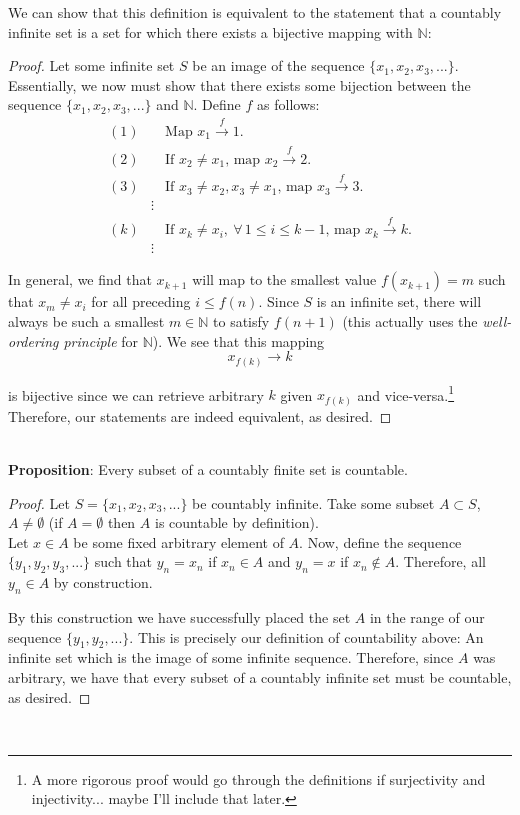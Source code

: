\documentclass[12pt]{article}
\newlength\tindent
\renewcommand{\indent}{\hspace*{\tindent}}
\newcommand{\N}{\mathbb N}
\begin{document}
\indent We can show that this definition is equivalent to the statement that a countably infinite set is a set for which there exists a bijective mapping with $\N$:
\begin{proof} Let some infinite set $S$ be an image of the sequence $\{x_1, x_2, x_3,...\}$. Essentially, we now must show that there exists some bijection between the sequence $\{x_1, x_2, x_3,...\}$ and $\N$. Define $f$ as follows:
\begin{align*}
	(1)& \quad \text{Map $x_1 \stackrel{f}{\to} 1$.} \\
	(2)& \quad \text{If $x_2 \neq x_1$, map $x_2 \stackrel{f}{\to} 2$.} \\
	(3)& \quad \text{If $x_3 \neq x_2, x_3 \neq x_1$, map $x_3 \stackrel{f}{\to} 3$.} \\
	&\vdots \\
	(k)& \quad \text{If $x_k \neq x_i,~\forall\,1 \leq i \leq k - 1$, map $x_k \stackrel{f}{\to} k$.} \\
	&\vdots 
\end{align*}

\indent In general, we find that $x_{k + 1}$ will map to the smallest value $f(x_{k + 1}) = m$ such that $x_m \neq x_i$ for all preceding $i \leq f(n)$. Since $S$ is an infinite set, there will always be such a smallest $m \in \N$ to satisfy $f(n + 1)$ (this actually uses the {\em well-ordering principle} for $\N$). We see that this mapping
\begin{equation*}
	x_{f(k)} \to k
\end{equation*}

is bijective since we can retrieve arbitrary $k$ given $x_{f(k)}$ and vice-versa.\footnote{A more rigorous proof would go through the definitions if surjectivity and injectivity... maybe I'll include that later.} Therefore, our statements are indeed equivalent, as desired.
\end{proof} \hfill\\

{\bf Proposition}: Every subset of a countably finite set is countable.

\begin{proof} Let $S = \{x_1, x_2, x_3,...\}$ be countably infinite. Take some subset $A \subset S$, $A \neq \emptyset$ (if $A = \emptyset$ then $A$ is countable by definition). \\

\indent Let $x \in A$ be some fixed arbitrary element of $A$. Now, define the sequence $\{y_1, y_2, y_3, ...\}$ such that $y_n = x_n$ if $x_n \in A$ and $y_n = x$ if $x_n \notin A$. Therefore, all $y_n \in A$ by construction.

By this construction we have successfully placed the set $A$ in the range of our sequence $\{y_1, y_2, ...\}$. This is precisely our definition of countability above: An infinite set which is the image of some infinite sequence. Therefore, since $A$ was arbitrary, we have that every subset of a countably infinite set must be countable, as desired.
\end{proof} \hfill\\
\end{document}
